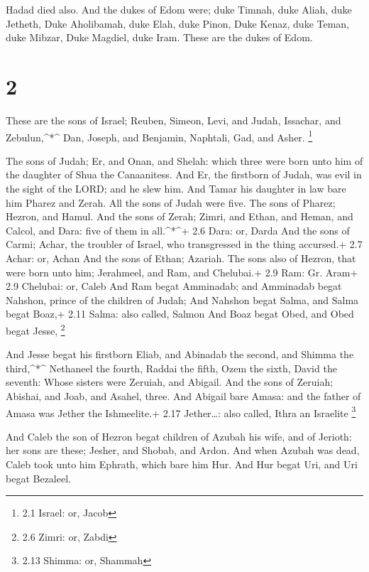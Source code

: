  Hadad died also. And the dukes of Edom were; duke Timnah,
duke Aliah, duke Jetheth,  Duke Aholibamah, duke Elah, duke
Pinon,  Duke Kenaz, duke Teman, duke Mibzar, 
Duke Magdiel, duke Iram. These are the dukes of Edom.

\hypertarget{section-1}{%
\section{2}\label{section-1}}

 These are the sons of Israel; Reuben, Simeon, Levi, and
Judah, Issachar, and Zebulun,\^{}*\^{}  Dan, Joseph, and
Benjamin, Naphtali, Gad, and Asher. \footnote{2.1 Israel: or, Jacob}

 The sons of Judah; Er, and Onan, and Shelah: which three
were born unto him of the daughter of Shua the Canaanitess. And Er, the
firstborn of Judah, was evil in the sight of the LORD; and he slew him.
 And Tamar his daughter in law bare him Pharez and Zerah.
All the sons of Judah were five.  The sons of Pharez;
Hezron, and Hamul.  And the sons of Zerah; Zimri, and Ethan,
and Heman, and Calcol, and Dara: five of them in all.\^{}*\^{}+ 2.6
Dara: or, Darda  And the sons of Carmi; Achar, the troubler
of Israel, who transgressed in the thing accursed.+ 2.7 Achar: or, Achan
 And the sons of Ethan; Azariah.  The sons also
of Hezron, that were born unto him; Jerahmeel, and Ram, and Chelubai.+
2.9 Ram: Gr. Aram+ 2.9 Chelubai: or, Caleb  And Ram begat
Amminadab; and Amminadab begat Nahshon, prince of the children of Judah;
 And Nahshon begat Salma, and Salma begat Boaz,+ 2.11
Salma: also called, Salmon  And Boaz begat Obed, and Obed
begat Jesse, \footnote{2.6 Zimri: or, Zabdi}

 And Jesse begat his firstborn Eliab, and Abinadab the
second, and Shimma the third,\^{}*\^{}  Nethaneel the
fourth, Raddai the fifth,  Ozem the sixth, David the
seventh:  Whose sisters were Zeruiah, and Abigail. And the
sons of Zeruiah; Abishai, and Joab, and Asahel, three.  And
Abigail bare Amasa: and the father of Amasa was Jether the Ishmeelite.+
2.17 Jether\ldots: also called, Ithra an Israelite \footnote{2.13
  Shimma: or, Shammah}

 And Caleb the son of Hezron begat children of Azubah his
wife, and of Jerioth: her sons are these; Jesher, and Shobab, and Ardon.
 And when Azubah was dead, Caleb took unto him Ephrath,
which bare him Hur.  And Hur begat Uri, and Uri begat
Bezaleel.

